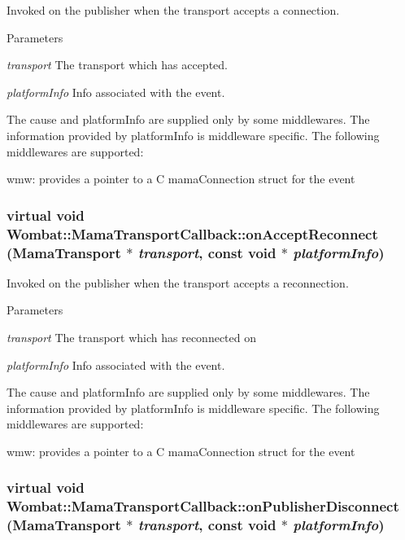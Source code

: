 Invoked on the publisher when the transport accepts a connection. 
\begin{DoxyParams}{Parameters}
\item[{\em transport}]The transport which has accepted. \item[{\em platformInfo}]Info associated with the event.\end{DoxyParams}
The cause and platformInfo are supplied only by some middlewares. The information provided by platformInfo is middleware specific. The following middlewares are supported:

wmw: provides a pointer to a C mamaConnection struct for the event \hypertarget{classWombat_1_1MamaTransportCallback_ac159ce9502ac78e5eb5e85d911c5ee08}{
\subsubsection[{onAcceptReconnect}]{\setlength{\rightskip}{0pt plus 5cm}virtual void Wombat::MamaTransportCallback::onAcceptReconnect ({\bf MamaTransport} $\ast$ {\em transport}, \/  const void $\ast$ {\em platformInfo})}}
\label{classWombat_1_1MamaTransportCallback_ac159ce9502ac78e5eb5e85d911c5ee08}


Invoked on the publisher when the transport accepts a reconnection. 
\begin{DoxyParams}{Parameters}
\item[{\em transport}]The transport which has reconnected on \item[{\em platformInfo}]Info associated with the event.\end{DoxyParams}
The cause and platformInfo are supplied only by some middlewares. The information provided by platformInfo is middleware specific. The following middlewares are supported:

wmw: provides a pointer to a C mamaConnection struct for the event \hypertarget{classWombat_1_1MamaTransportCallback_aae668afa6fad15114385473ac1ecfaaf}{
\subsubsection[{onPublisherDisconnect}]{\setlength{\rightskip}{0pt plus 5cm}virtual void Wombat::MamaTransportCallback::onPublisherDisconnect ({\bf MamaTransport} $\ast$ {\em transport}, \/  const void $\ast$ {\em platformInfo})}}
\label{classWombat_1_1MamaTransportCallback_aae668afa6fad15114385473ac1ecfaaf}


